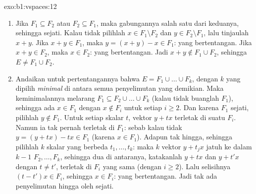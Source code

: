 \begin{solution}{exo:b1:vspaces:12}
\begin{enumerate}
  \item Jika $F_1 \subseteq F_2$ atau $F_2 \subseteq F_1$, maka gabungannya
        salah satu dari keduanya, sehingga sejati. Kalau tidak pilihlah $x \in F_1
        \setminus F_2$ dan $y \in F_2 \setminus F_1$, lalu tinjaulah
        $x + y$. Jika $x + y \in F_1$, maka $y = (x + y) - x \in
        F_1$: yang bertentangan. Jika $x + y \in F_2$, maka $x \in F_2$:
        yang bertentangan. Jadi $x + y \notin F_1 \cup F_2$, sehingga $E \neq
        F_1 \cup F_2$.
  \item Andaikan untuk pertentangannya bahwa $E = F_1 \cup \dots \cup
        F_k$, dengan $k$ yang dipilih \emph{minimal} di antara semua
        penyelimutan yang demikian. Maka keminimalannya melarang $F_1 \subseteq F_2 \cup
        \dots \cup F_k$ (kalau tidak buanglah $F_1$), sehingga ada $x \in F_1$
        dengan $x \notin F_i$ untuk setiap $i \geq 2$. Dan karena $F_1$
        sejati, pilihlah $y \notin F_1$. Untuk setiap skalar $t$,
        vektor $y + t x$ terletak di suatu $F_i$. Namun ia tak pernah terletak di
        $F_1$: sebab kalau tidak $y = (y + tx) - tx \in F_1$ (karena $x \in
        F_1$). Adapun  tak hingga, sehingga pilihlah $k$ skalar
        yang berbeda $t_1, \dots, t_k$: maka $k$ vektor $y + t_j x$
        jatuh ke dalam $k - 1$  $F_2, \dots, F_k$, sehingga dua
        di antaranya, katakanlah $y + t x$ dan $y + t' x$ dengan $t \neq t'$,
        terletak di $F_i$ yang sama (dengan $i \geq 2$). Lalu selisihnya
        $(t - t')x \in F_i$, sehingga $x \in F_i$: yang bertentangan. Jadi
        tak ada penyelimutan hingga oleh  sejati.
\end{enumerate}
\end{solution}

